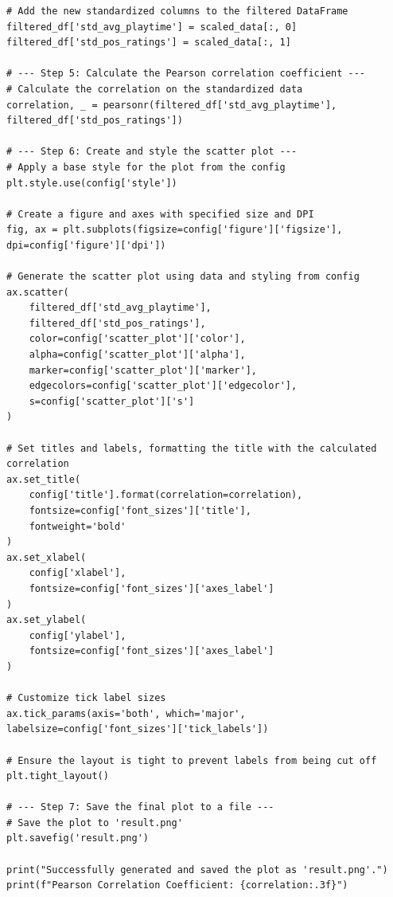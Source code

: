 \begin{verbatim}
# Add the new standardized columns to the filtered DataFrame
filtered_df['std_avg_playtime'] = scaled_data[:, 0]
filtered_df['std_pos_ratings'] = scaled_data[:, 1]

# --- Step 5: Calculate the Pearson correlation coefficient ---
# Calculate the correlation on the standardized data
correlation, _ = pearsonr(filtered_df['std_avg_playtime'], filtered_df['std_pos_ratings'])

# --- Step 6: Create and style the scatter plot ---
# Apply a base style for the plot from the config
plt.style.use(config['style'])

# Create a figure and axes with specified size and DPI
fig, ax = plt.subplots(figsize=config['figure']['figsize'], dpi=config['figure']['dpi'])

# Generate the scatter plot using data and styling from config
ax.scatter(
    filtered_df['std_avg_playtime'],
    filtered_df['std_pos_ratings'],
    color=config['scatter_plot']['color'],
    alpha=config['scatter_plot']['alpha'],
    marker=config['scatter_plot']['marker'],
    edgecolors=config['scatter_plot']['edgecolor'],
    s=config['scatter_plot']['s']
)

# Set titles and labels, formatting the title with the calculated correlation
ax.set_title(
    config['title'].format(correlation=correlation),
    fontsize=config['font_sizes']['title'],
    fontweight='bold'
)
ax.set_xlabel(
    config['xlabel'],
    fontsize=config['font_sizes']['axes_label']
)
ax.set_ylabel(
    config['ylabel'],
    fontsize=config['font_sizes']['axes_label']
)

# Customize tick label sizes
ax.tick_params(axis='both', which='major', labelsize=config['font_sizes']['tick_labels'])

# Ensure the layout is tight to prevent labels from being cut off
plt.tight_layout()

# --- Step 7: Save the final plot to a file ---
# Save the plot to 'result.png'
plt.savefig('result.png')

print("Successfully generated and saved the plot as 'result.png'.")
print(f"Pearson Correlation Coefficient: {correlation:.3f}")
\end{verbatim}


